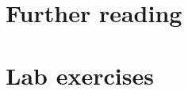 \documentclass[11pt]{book}\usepackage[]{graphicx}\usepackage[]{color}
\begin{document}
\section{Further reading}\label{sec:ca-reading}
\section{Lab exercises}\label{sec:ca-lab}



%
%
%
%
%
%

%
%
%
\backmatter
{}
{\itemsep -1pt

}

%

\printindex
	
\end{document}
